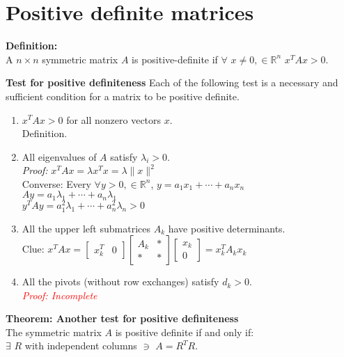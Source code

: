 \section{Positive definite matrices}

\textbf{Definition:}\\
A $n \times n$ symmetric matrix $A$ is positive-definite if $\forall$ $x \neq 0, \in \mathbb{R}^n$ $x^TAx > 0$.

\vspace{6pt}


\textbf{Test for positive definiteness}
Each of the following test is a necessary and sufficient condition for a matrix to be positive definite.
\begin{enumerate}
\item $x^TAx > 0$ for all nonzero vectors $x$.\\
Definition.
\item All eigenvalues of $A$ satisfy $\lambda_i > 0$.\\
\textit{Proof:} $x^TAx = \lambda x^Tx = \lambda \|x\|^2$\\
Converse: Every $\forall y > 0,  \in \mathbb{R}^n$, $y = a_1x_1 + \cdots + a_nx_n$\\
$Ay = a_1\lambda_1 + \cdots + a_n\lambda_1$\\
$y^TAy = a_1^2 \lambda_1 + \cdots + a_n^2 \lambda_n > 0$
\item All the upper left submatrices $A_k$ have positive determinants.\\
Clue:
$
x^TAx = 
\begin{bmatrix}
x_k^T & 0	
\end{bmatrix}
\begin{bmatrix}
A_k & * \\
* & * 
\end{bmatrix}
\begin{bmatrix}
x_k\\
0
\end{bmatrix}
= x_k^TA_kx_k
$

\item All the pivots (without row exchanges) satisfy $d_k > 0$.\\
\textcolor{red}{\textit{Proof: Incomplete}}

\end{enumerate}

\vspace{6pt}


\textbf{Theorem: Another test for positive definiteness}\\
The symmetric matrix $A$ is positive definite if and only if:\\
$\exists$ $R$ with independent columns $\ni$ $A = R^TR$.

